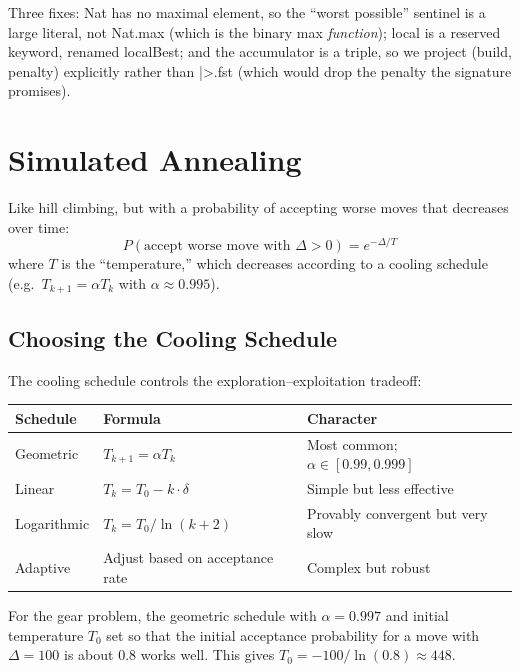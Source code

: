 \documentclass[11pt, a4paper, oneside]{book}
\newcommand{\li}[1]{{\ttfamily\small\color{deepblue}#1}}
\begin{document}
Three fixes: \li{Nat} has no maximal element, so the ``worst possible''
sentinel is a large literal, not \li{Nat.max} (which is the binary \li{max}
\emph{function}); \li{local} is a reserved keyword, renamed \li{localBest}; and
the accumulator is a triple, so we project \li{(build, penalty)} explicitly
rather than \li{|>.fst} (which would drop the penalty the signature promises).

\section{Simulated Annealing}

\begin{defbox}[title={Simulated Annealing}]
Like hill climbing, but with a probability of accepting worse moves that
decreases over time:
\[
  P(\text{accept worse move with }\Delta > 0) = e^{-\Delta / T}
\]
where $T$ is the ``temperature,'' which decreases according to a cooling
schedule (e.g.\ $T_{k+1} = \alpha T_k$ with $\alpha \approx 0.995$).
\end{defbox}

\subsection{Choosing the Cooling Schedule}

The cooling schedule controls the exploration--exploitation tradeoff:

\begin{center}
\small
\begin{tabular}{lll}
\toprule
\textbf{Schedule} & \textbf{Formula} & \textbf{Character} \\
\midrule
Geometric & $T_{k+1} = \alpha T_k$ & Most common; $\alpha \in [0.99, 0.999]$ \\
Linear & $T_k = T_0 - k \cdot \delta$ & Simple but less effective \\
Logarithmic & $T_k = T_0 / \ln(k + 2)$ & Provably convergent but very slow \\
Adaptive & Adjust based on acceptance rate & Complex but robust \\
\bottomrule
\end{tabular}
\end{center}

For the gear problem, the geometric schedule with $\alpha = 0.997$ and
initial temperature $T_0$ set so that the initial acceptance probability
for a move with $\Delta = 100$ is about $0.8$ works well.  This gives
$T_0 = -100 / \ln(0.8) \approx 448$.
\end{document}
